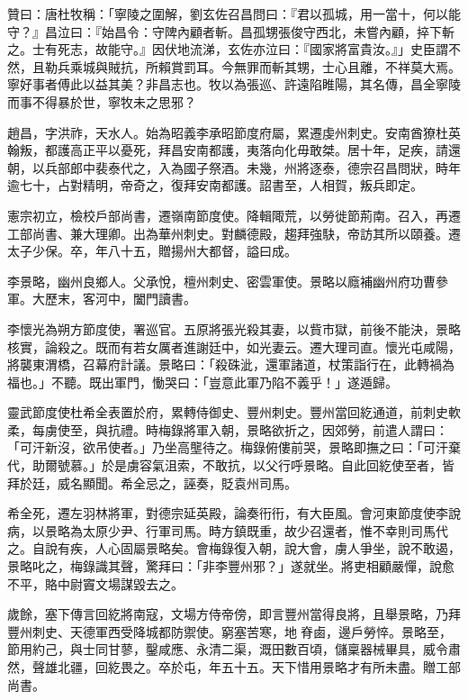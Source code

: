 \begin{pinyinscope}
 贊曰：唐杜牧稱：「寧陵之圍解，劉玄佐召昌問曰：『君以孤城，用一當十，何以能守？』昌泣曰：『始昌令：守陴內顧者斬。昌孤甥張俊守西北，未嘗內顧，捽下斬之。士有死志，故能守。』因伏地流涕，玄佐亦泣曰：『國家將富貴汝。』」史臣謂不然，且勒兵乘城與賊抗，所賴賞罰耳。今無罪而斬其甥，士心且離，不祥莫大焉。寧好事者傅此以益其美？非昌志也。牧以為張巡、許遠陷睢陽，其名傳，昌全寧陵而事不得暴於世，寧牧未之思邪？



 趙昌，字洪祚，天水人。始為昭義李承昭節度府屬，累遷虔州刺史。安南酋獠杜英翰叛，都護高正平以憂死，拜昌安南都護，夷落向化毋敢桀。居十年，足疾，請還朝，以兵部郎中裴泰代之，入為國子祭酒。未幾，州將逐泰，德宗召昌問狀，時年逾七十，占對精明，帝奇之，復拜安南都護。詔書至，人相賀，叛兵即定。



 憲宗初立，檢校戶部尚書，遷嶺南節度使。降輯陬荒，以勞徙節荊南。召入，再遷工部尚書、兼大理卿。出為華州刺史。對麟德殿，趨拜強駃，帝訪其所以頤養。遷太子少保。卒，年八十五，贈揚州大都督，謚曰成。



 李景略，幽州良鄉人。父承悅，檀州刺史、密雲軍使。景略以廕補幽州府功曹參軍。大歷末，客河中，闔門讀書。



 李懷光為朔方節度使，署巡官。五原將張光殺其妻，以貲市獄，前後不能決，景略核實，論殺之。既而有若女厲者進謝廷中，如光妻云。遷大理司直。懷光屯咸陽，將襲東渭橋，召幕府計議。景略曰：「殺硃泚，還軍諸道，杖策詣行在，此轉禍為福也。」不聽。既出軍門，慟哭曰：「豈意此軍乃陷不義乎！」遂遁歸。



 靈武節度使杜希全表置於府，累轉侍御史、豐州刺史。豐州當回紇通道，前刺史軟柔，每虜使至，與抗禮。時梅錄將軍入朝，景略欲折之，因郊勞，前遣人謂曰：「可汗新沒，欲吊使者。」乃坐高壟待之。梅錄俯僂前哭，景略即撫之曰：「可汗棄代，助爾號慕。」於是虜容氣沮索，不敢抗，以父行呼景略。自此回紇使至者，皆拜於廷，威名顯聞。希全忌之，誣奏，貶袁州司馬。



 希全死，遷左羽林將軍，對德宗延英殿，論奏衎衎，有大臣風。會河東節度使李說病，以景略為太原少尹、行軍司馬。時方鎮既重，故少召還者，惟不幸則司馬代之。自說有疾，人心固屬景略矣。會梅錄復入朝，說大會，虜人爭坐，說不敢遏，景略叱之，梅錄識其聲，驚拜曰：「非李豐州邪？」遂就坐。將吏相顧嚴憚，說愈不平，賂中尉竇文場謀毀去之。



 歲餘，塞下傳言回紇將南寇，文場方侍帝傍，即言豐州當得良將，且舉景略，乃拜豐州刺史、天德軍西受降城都防禦使。窮塞苦寒，地脊鹵，邊戶勞悴。景略至，節用約己，與士同甘蓼，鑿咸應、永清二渠，溉田數百頃，儲稟器械畢具，威令肅然，聲雄北疆，回紇畏之。卒於屯，年五十五。天下惜用景略才有所未盡。贈工部尚書。




\end{pinyinscope}
